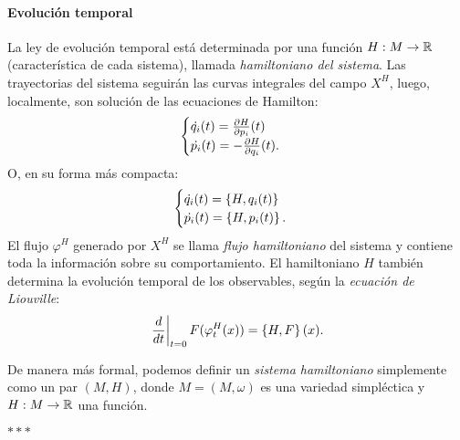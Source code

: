 \paragraph{\textbf{Evolución temporal}} La ley de evolución temporal está determinada por una función $H:M\rightarrow \mathbb{R}$ (característica de cada sistema), llamada \emph{hamiltoniano del sistema}. Las trayectorias del sistema seguirán las curvas integrales del campo $X^H$, luego, localmente, son solución de las ecuaciones de Hamilton:
  \begin{equation*}
  \begin{cases}
     \dot{q_i}(t) = \frac{\partial H}{\partial p_i}(t) \\
     \dot{p_i}(t) = -\frac{\partial H}{\partial q_i} (t).
  \end{cases}
\end{equation*}
O, en su forma más compacta:
  \begin{equation*}
    \begin{cases}
      \dot{q_i}(t)= \left\lbrace H,q_i(t)\right\rbrace \\
      \dot{p_i}(t)= \left\lbrace H,p_i(t)\right\rbrace.
  \end{cases}
  \end{equation*}
  El flujo $\varphi^H$ generado por $X^H$ se llama \emph{flujo hamiltoniano} del sistema y contiene toda la información sobre su comportamiento. El hamiltoniano $H$ también determina la evolución temporal de los observables, según la \emph{ecuación de Liouville}:
  \begin{equation*}
    \left.\frac{d}{dt}\right|_{t=0}F(\varphi_t^H(x))=\left\lbrace H,F\right\rbrace(x).
  \end{equation*}
  
  De manera más formal, podemos definir un \emph{sistema hamiltoniano} simplemente como un par $(M,H)$, donde $M=(M,\omega)$ es una variedad simpléctica y $H:M\rightarrow \mathbb{R}$ una función.
  
  \begin{center}  $\ast\ast\ast$ \end{center}

